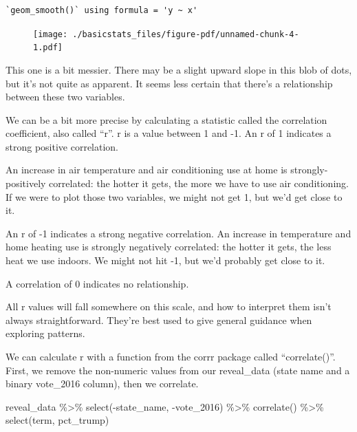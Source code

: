\documentclass[
  letterpaper,
  DIV=11,
  numbers=noendperiod]{scrreprt}
\newenvironment{Shaded}{\begin{snugshade}}{\end{snugshade}}
\newcommand{\FunctionTok}[1]{\textcolor[rgb]{0.28,0.35,0.67}{#1}}
\newcommand{\NormalTok}[1]{\textcolor[rgb]{0.00,0.23,0.31}{#1}}
\newcommand{\SpecialCharTok}[1]{\textcolor[rgb]{0.37,0.37,0.37}{#1}}
\begin{document}
\begin{verbatim}
`geom_smooth()` using formula = 'y ~ x'
\end{verbatim}

\begin{figure}[H]

{\centering \texttt{[image: ./basicstats\_files/figure-pdf/unnamed-chunk-4-1.pdf]}

}

\end{figure}

This one is a bit messier. There may be a slight upward slope in this
blob of dots, but it's not quite as apparent. It seems less certain that
there's a relationship between these two variables.

We can be a bit more precise by calculating a statistic called the
correlation coefficient, also called ``r''. r is a value between 1 and
-1. An r of 1 indicates a strong positive correlation.

An increase in air temperature and air conditioning use at home is
strongly-positively correlated: the hotter it gets, the more we have to
use air conditioning. If we were to plot those two variables, we might
not get 1, but we'd get close to it.

An r of -1 indicates a strong negative correlation. An increase in
temperature and home heating use is strongly negatively correlated: the
hotter it gets, the less heat we use indoors. We might not hit -1, but
we'd probably get close to it.

A correlation of 0 indicates no relationship.

All r values will fall somewhere on this scale, and how to interpret
them isn't always straightforward. They're best used to give general
guidance when exploring patterns.

We can calculate r with a function from the corrr package called
``correlate()''. First, we remove the non-numeric values from our
reveal\_data (state name and a binary vote\_2016 column), then we
correlate.

\begin{Shaded}
\begin{Highlighting}[]
\NormalTok{reveal\_data }\SpecialCharTok{\%\textgreater{}\%}
  \FunctionTok{select}\NormalTok{(}\SpecialCharTok{{-}}\NormalTok{state\_name, }\SpecialCharTok{{-}}\NormalTok{vote\_2016) }\SpecialCharTok{\%\textgreater{}\%}
  \FunctionTok{correlate}\NormalTok{() }\SpecialCharTok{\%\textgreater{}\%}
  \FunctionTok{select}\NormalTok{(term, pct\_trump)}
\end{Highlighting}
\end{Shaded}
\end{document}
